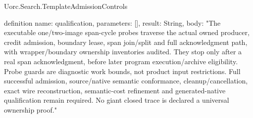 \begin{lexlean}{Uorc.Search.TemplateAdmissionControls}
\begin{semanticmodule}
definition{
  name: qualification,
  parameters: [],
  result: String,
  body: "The executable one/two-image span-cycle probes traverse the actual owned producer, credit admission, boundary lease, span join/split and full acknowledgment path, with wrapper/boundary ownership inventories audited. They stop only after a real span acknowledgment, before later program execution/archive eligibility. Probe guards are diagnostic work bounds, not product input restrictions. Full successful admission, source/native semantic conformance, cleanup/cancellation, exact wire reconstruction, semantic-cost refinement and generated-native qualification remain required. No giant closed trace is declared a universal ownership proof."
}
\end{semanticmodule}
\end{lexlean}
